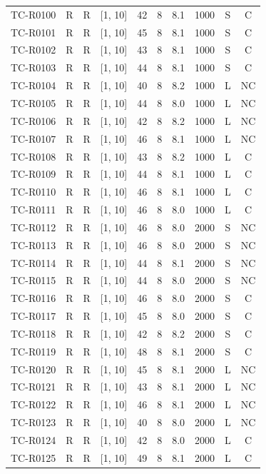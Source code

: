 \begin{longtable}{lccccccccc}
TC-R0100 & R & R & [1, 10] & 42 & 8 & 8.1 & 1000 & S & C \\
TC-R0101 & R & R & [1, 10] & 45 & 8 & 8.1 & 1000 & S & C \\
TC-R0102 & R & R & [1, 10] & 43 & 8 & 8.1 & 1000 & S & C \\
TC-R0103 & R & R & [1, 10] & 44 & 8 & 8.1 & 1000 & S & C \\
TC-R0104 & R & R & [1, 10] & 40 & 8 & 8.2 & 1000 & L & NC \\
TC-R0105 & R & R & [1, 10] & 44 & 8 & 8.0 & 1000 & L & NC \\
TC-R0106 & R & R & [1, 10] & 42 & 8 & 8.2 & 1000 & L & NC \\
TC-R0107 & R & R & [1, 10] & 46 & 8 & 8.1 & 1000 & L & NC \\
TC-R0108 & R & R & [1, 10] & 43 & 8 & 8.2 & 1000 & L & C \\
TC-R0109 & R & R & [1, 10] & 44 & 8 & 8.1 & 1000 & L & C \\
TC-R0110 & R & R & [1, 10] & 46 & 8 & 8.1 & 1000 & L & C \\
TC-R0111 & R & R & [1, 10] & 46 & 8 & 8.0 & 1000 & L & C \\
TC-R0112 & R & R & [1, 10] & 46 & 8 & 8.0 & 2000 & S & NC \\
TC-R0113 & R & R & [1, 10] & 46 & 8 & 8.0 & 2000 & S & NC \\
TC-R0114 & R & R & [1, 10] & 44 & 8 & 8.1 & 2000 & S & NC \\
TC-R0115 & R & R & [1, 10] & 44 & 8 & 8.0 & 2000 & S & NC \\
TC-R0116 & R & R & [1, 10] & 46 & 8 & 8.0 & 2000 & S & C \\
TC-R0117 & R & R & [1, 10] & 45 & 8 & 8.0 & 2000 & S & C \\
TC-R0118 & R & R & [1, 10] & 42 & 8 & 8.2 & 2000 & S & C \\
TC-R0119 & R & R & [1, 10] & 48 & 8 & 8.1 & 2000 & S & C \\
TC-R0120 & R & R & [1, 10] & 45 & 8 & 8.1 & 2000 & L & NC \\
TC-R0121 & R & R & [1, 10] & 43 & 8 & 8.1 & 2000 & L & NC \\
TC-R0122 & R & R & [1, 10] & 46 & 8 & 8.1 & 2000 & L & NC \\
TC-R0123 & R & R & [1, 10] & 40 & 8 & 8.0 & 2000 & L & NC \\
TC-R0124 & R & R & [1, 10] & 42 & 8 & 8.0 & 2000 & L & C \\
TC-R0125 & R & R & [1, 10] & 49 & 8 & 8.1 & 2000 & L & C \\

\end{longtable}
